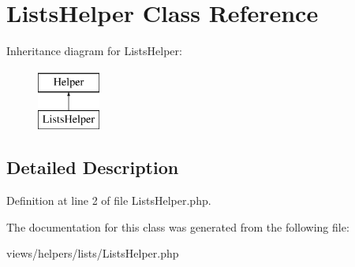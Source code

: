 \hypertarget{class_lists_helper}{
\section{ListsHelper Class Reference}
\label{class_lists_helper}
}
Inheritance diagram for ListsHelper:\begin{figure}[H]
\begin{center}
\leavevmode
\includegraphics[height=2.000000cm]{class_lists_helper}
\end{center}
\end{figure}


\subsection{Detailed Description}


Definition at line 2 of file ListsHelper.php.



The documentation for this class was generated from the following file:\begin{DoxyCompactItemize}
\item 
views/helpers/lists/ListsHelper.php\end{DoxyCompactItemize}
